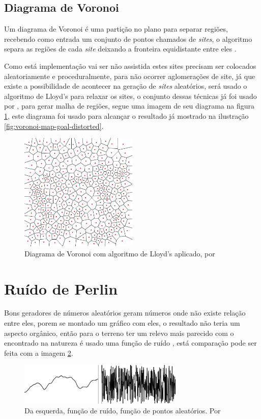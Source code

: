 \subsection{Diagrama de Voronoi}
Um diagrama de Voronoi é uma partição no plano para separar regiões, recebendo
como entrada um conjunto de pontos chamados de \textit{sites}, o algoritmo
separa as regiões de cada \textit{site} deixando a fronteira equidistante entre eles
\cite{fortune1987sweepline}.

Como está implementação vai ser não assistida estes sites precisam ser colocados
aleatoriamente e proceduralmente, para não ocorrer aglomerações de site, já
que existe a possibilidade de acontecer na geração de \textit{sites} aleatórios,
será usado o algoritmo de Lloyd's para relaxar os sites, o conjunto dessas
técnicas já foi usado por \cite{patel2010polygonal}, para gerar malha de regiões,
segue uma imagem de seu diagrama na figura \ref{fig:voronoi-2-lloyd}, este diagrama
foi usado para alcançar o resultado já mostrado na ilustração \ref{fig:voronoi-map-goal-distorted}.
\begin{figure}[H]
    \centering
    \includegraphics[width=0.5\textwidth]{figuras/voronoi-2-lloyd.png}
    \caption{Diagrama de Voronoi com algoritmo de Lloyd's aplicado, por \cite{patel2010polygonal}}
    \label{fig:voronoi-2-lloyd}
\end{figure}

\section{Ruído de Perlin}
Bons geradores de números aleatórios geram números onde não existe relação entre
eles, porem se montado um gráfico com eles, o resultado não teria um aspecto
orgânico, então para o terreno ter um relevo mais parecido com o encontrado na 
natureza é usado uma função de ruído \cite{shiffman2012nature}, está comparação
pode ser feita com a imagem \ref{fig:randomAndNoise}. 
\begin{figure}[H]
    \centering
    \includegraphics[width=0.7\textwidth]{figuras/randomAndNoise.png}
    \caption{Da esquerda, função de ruído, função de pontos aleatórios. Por \cite{shiffman2012nature}}
    \label{fig:randomAndNoise}
\end{figure}

